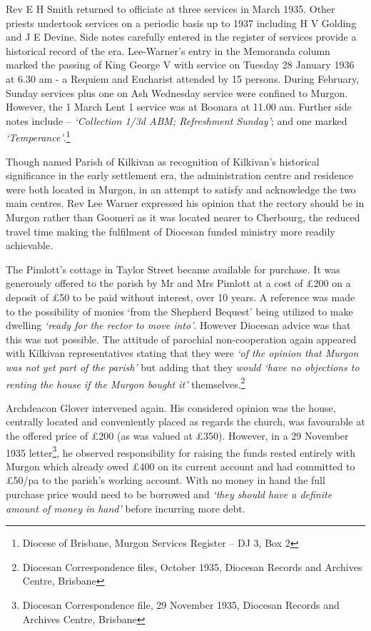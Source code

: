 Rev E H Smith returned to officiate at three services in March 1935. Other priests undertook services on a periodic basis up to 1937 including H V Golding and J E Devine. Side notes carefully entered in the register of services provide a historical record of the era. Lee-Warner's entry in the Memoranda column marked the passing of King George V with service on Tuesday 28 January 1936 at 6.30 am - a Requiem and Eucharist attended by 15 persons. During February, Sunday services plus one on Ash Wednesday service were confined to Murgon. However, the 1 March Lent 1 service was at Boonara at 11.00 am. Further side notes include -- \emph{`Collection 1/3d ABM; Refreshment Sunday'}; and one marked \emph{`Temperance'}.\footnote{Diocese of Brisbane, Murgon Services Register -- DJ 3, Box 2}


Though named Parish of Kilkivan as recognition of Kilkivan's historical significance in the early settlement era, the administration centre and residence were both located in Murgon, in an attempt to satisfy and acknowledge the two main centres. Rev Lee Warner expressed his opinion that the rectory should be in Murgon rather than Goomeri as it was located nearer to Cherbourg, the reduced travel time making the fulfilment of Diocesan funded ministry more readily achievable.



The Pimlott's cottage in Taylor Street became available for purchase. It was generously offered to the parish by Mr and Mrs Pimlott at a cost of \pounds200 on a deposit of \pounds50 to be paid without interest, over 10 years. A reference was made to the possibility of monies `from the Shepherd Bequest' being utilized to make dwelling \emph{`ready for the rector to move into'}. However Diocesan advice was that this was not possible. The attitude of parochial non-cooperation again appeared with Kilkivan representatives stating that they were \emph{`of the opinion that Murgon was not yet part of the parish'} but adding that they \emph{would `have no objections to renting the house if the Murgon bought it'} themselves.\footnote{Diocesan Correspondence files, October 1935, Diocesan Records and Archives Centre, Brisbane}


Archdeacon Glover intervened again. His considered opinion was the house, centrally located and conveniently placed as regards the church, was favourable at the offered price of \pounds200 (as was valued at \pounds350). However, in a 29 November 1935 letter\footnote{Diocesan Correspondence file, 29 November 1935, Diocesan Records and Archives Centre, Brisbane}, he observed responsibility for raising the funds rested entirely with Murgon which already owed \pounds400 on its current account and had committed to \pounds50/pa to the parish's working account. With no money in hand the full purchase price would need to be borrowed and \emph{`they should have a definite amount of money in hand'} before incurring more debt.


